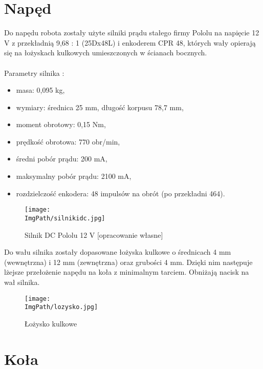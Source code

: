 \documentclass[a4paper,12pt,twoside,openany]{report}
\newcommand{\ImgPath}{.}
\begin{document}
\section{Napęd}

Do napędu robota zostały użyte silniki prądu stałego firmy Pololu na napięcie 12 V z przekładnią 9,68 : 1 (25Dx48L) i enkoderem CPR 48, których wały opierają się na łożyskach kulkowych umieszczonych w ścianach bocznych.\\
\\
Parametry silnika \cite{pololu}:
\begin{itemize}
\item masa: 0,095 kg,
\item wymiary: średnica 25 mm, długość korpusu 78,7 mm,
\item moment obrotowy: 0,15 Nm,
\item prędkość obrotowa:	770 obr/min,
\item średni pobór prądu:	200 mA,
\item maksymalny pobór prądu:	2100 mA,
\item rozdzielczość enkodera: 48 impulsów na obrót (po przekładni 464).
\end{itemize}

\begin{figure}[!htbp]
	\begin{center}
\centering
\texttt{[image: \\ImgPath/silnikidc.jpg]}
\end{center}
	\caption{Silnik DC Pololu 12 V [opracowanie własne]}
	\label{schematKomunikacji}
\end{figure}

\newpage
\noindent Do wału silnika zostały dopasowane łożyska kulkowe o średnicach 4 mm (wewnętrzna) i 12 mm (zewnętrzna) oraz grubości 4 mm. Dzięki nim następuje lżejsze przełożenie napędu na koła z minimalnym tarciem. Obniżają nacisk na wał silnika.

\begin{figure}[!htbp]
	\begin{center}
\centering
\texttt{[image: \\ImgPath/lozysko.jpg]}
\end{center}
	\caption{Łożysko kulkowe \cite{lozysko}}
	\label{schematKomunikacji}
\end{figure}
 
\section{Koła}
\end{document}

